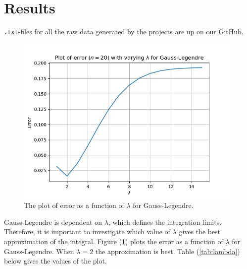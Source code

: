 \documentclass{article}
\begin{document}
\section{Results} \label{sec:Results}

  \texttt{.txt}-files for all the raw data generated by the projects are up on our \href{https://github.com/Erikbgram/Fys3150}{GitHub}. \\

  \begin{figure}[ht]
  	\centering
    \includegraphics[width = 11cm]{images/error-lambda.png}
  	\caption{The plot of error as a function of $\lambda$ for Gauss-Legendre. }
    \label{fig:lambdapng}
  \end{figure}

  Gauss-Legendre is dependent on $\lambda$, which defines the integration limits. Therefore, it is important to investigate which value of $\lambda$ gives the best approximation of the integral. Figure (\ref{fig:lambdapng}) plots the error as a function of $\lambda$ for Gauss-Legendre. When $\lambda = 2$ the approximation is best. Table (\ref{tab:lambda}) below gives the values of the plot. \\
\end{document}
